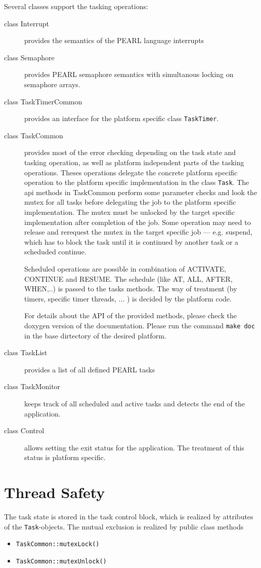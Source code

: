 Several classes support the tasking operations:
\begin{description}
\item[class Interrupt] provides the semantics of the PEARL language interrupts
\item[class Semaphore] provides PEARL semaphore semantics with simultanous
   locking on semaphore arrays.
\item[class TaskTimerCommon] provides an interface for the platform
   specific class \verb|TaskTimer|. 
\item[class TaskCommon] provides most of the error checking depending on
   the task state and tasking operation, as well as platform independent
   parts of the tasking operations. Theses operations delegate the concrete
   platform specific operation to the platform specific implementation
   in the class \verb|Task|. The api methods in TaskCommon perform some
    parameter checks and look the mutex for all tasks before delegating 
    the job to the platform specific implementation. 
    The mutex must be unlocked by the target specific implementation 
    after completion of the job. Some operation may need to release and 
    rerequest the mutex in the target specific job --- e.g. suspend,
    which has to block the task until it is continued by another task
    or a scheduded continue.

   Scheduled operations are possible in combination of ACTIVATE, 
   CONTINUE and RESUME.
   The schedule (like AT, ALL, AFTER, WHEN,..) is passed to the 
   tasks methods. The way of treatment (by timers, specific timer threads, ... )
   is decided by the platform code.

   For details about the API of the provided methods, please check the doxygen 
   version of the documentation.
   Please run  the command \verb|make doc| in the base dirtectory of the
   desired platform.

\item[class TaskList] provides a list of all defined PEARL tasks
\item[class TaskMonitor] keeps track of all scheduled and active tasks and
   detects the end of the application.
\item[class Control] allows setting the exit status for the application. 
  The treatment of this status is platform specific.
\end{description}

\section{Thread Safety}
The task state is stored in the task control block, which is realized
by attributes of the \verb|Task|-objects.
The mutual exclusion is realized by  public class methods
\begin{itemize}
\item \verb|TaskCommon::mutexLock()|
\item \verb|TaskCommon::mutexUnlock()|
\end{itemize}
 

